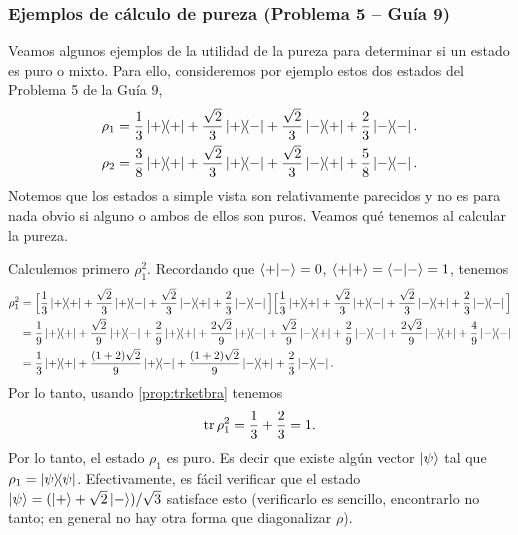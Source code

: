 \documentclass[10pt, a4paper]{article}
\numberwithin{equation}{subsection}
\begin{document}
\subsubsection{Ejemplos de cálculo de pureza (Problema 5 -- Guía 9)}
Veamos algunos ejemplos de la utilidad de la pureza para determinar si un
estado es puro o mixto. Para ello, consideremos por ejemplo estos dos estados
del Problema 5 de la Guía 9,
\begin{align}
  \rho_1 &= \frac{1}{3}\ketbra{+}{+} + \frac{\sqrt{2}}{3}\ketbra{+}{-} +
    \frac{\sqrt{2}}{3}\ketbra{-}{+} + \frac{2}{3}\ketbra{-}{-}. \\
  \rho_2 &= \frac{3}{8}\ketbra{+}{+} + \frac{\sqrt{2}}{3}\ketbra{+}{-} +
    \frac{\sqrt{2}}{3}\ketbra{-}{+} + \frac{5}{8}\ketbra{-}{-}.
\end{align}
Notemos que los estados a simple vista son relativamente parecidos y no es para
nada obvio si alguno o ambos de ellos son puros. Veamos qué tenemos al calcular
la pureza.

Calculemos primero $\rho_1^2$. Recordando que $\braket{+}{-} = 0$,
$\braket{+}{+} = \braket{-}{-} = 1$, tenemos
\begin{align}
  \rho_1^2
  &= \Big[ \frac{1}{3}\ketbra{+}{+} + \frac{\sqrt{2}}{3}\ketbra{+}{-} +
    \frac{\sqrt{2}}{3}\ketbra{-}{+} + \frac{2}{3}\ketbra{-}{-} \Big]
    \Big[ \frac{1}{3}\ketbra{+}{+} + \frac{\sqrt{2}}{3}\ketbra{+}{-} +
    \frac{\sqrt{2}}{3}\ketbra{-}{+} + \frac{2}{3}\ketbra{-}{-} \Big] \nonumber
    \\
  &= \frac{1}{9}\ketbra{+}{+} + \frac{\sqrt{2}}{9}\ketbra{+}{-} +
    \frac{2}{9}\ketbra{+}{+} + \frac{2\sqrt{2}}{9}\ketbra{+}{-} +
    \frac{\sqrt{2}}{9}\ketbra{-}{+} + \frac{2}{9}\ketbra{-}{-} +
    \frac{2\sqrt{2}}{9}\ketbra{-}{+} + \frac{4}{9}\ketbra{-}{-} \nonumber \\
  &= \frac{1}{3}\ketbra{+}{+} + \frac{(1+2)\sqrt{2}}{9}\ketbra{+}{-} +
    \frac{(1+2)\sqrt{2}}{9}\ketbra{-}{+} + \frac{2}{3}\ketbra{-}{-}.
\end{align}
Por lo tanto, usando \eqref{prop:trketbra} tenemos
\begin{equation}
  \tr\rho_1^2 = \frac{1}{3} + \frac{2}{3} = 1.
\end{equation}
Por lo tanto, el estado $\rho_1$ es puro. Es decir que existe algún vector
$\ket{\psi}$ tal que $\rho_1 = \projector{\psi}$. Efectivamente, es fácil
verificar que el estado $\ket{\psi} = (\ket{+} + \sqrt{2}\ket{-})/\sqrt{3}$
satisface esto (verificarlo es sencillo, encontrarlo no tanto; en general no
hay otra forma que diagonalizar $\rho$).
\end{document}
